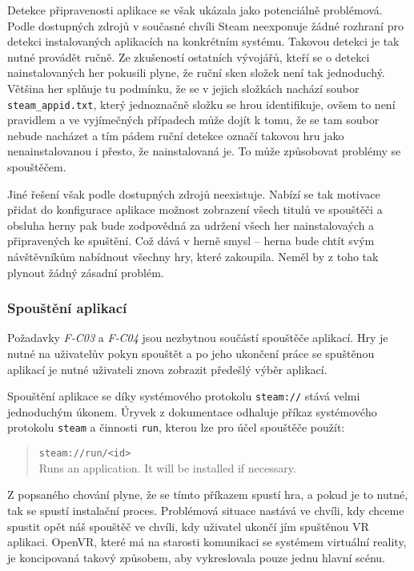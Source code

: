 Detekce připravenosti aplikace se však ukázala jako potenciálně
problémová. Podle dostupných zdrojů v současné chvíli Steam neexponuje
žádné rozhraní pro detekci instalovaných aplikacích na konkrétním
systému. Takovou detekci je tak nutné provádět ručně. Ze zkušeností
ostatních vývojářů, kteří se o detekci nainstalovaných her pokusili
plyne, že ruční sken složek není tak jednoduchý. Většina her splňuje tu
podmínku, že se v jejich složkách nachází soubor
\texttt{steam\_appid.txt}, který jednoznačně složku se hrou
identifikuje, ovšem to není pravidlem a ve vyjímečných případech může
dojít k tomu, že se tam soubor nebude nacházet a tím pádem ruční detekce
označí takovou hru jako nenainstalovanou i přesto, že nainstalovaná je.
To může způsobovat problémy se spouštěčem.

Jiné řešení však podle dostupných zdrojů neexistuje. Nabízí se tak
motivace přidat do konfigurace aplikace možnost zobrazení všech titulů
ve spouštěči a obsluha herny pak bude zodpovědná za udržení všech her
nainstalovaých a připravených ke spuštění. Což dává v herně smysl --
herna bude chtít svým návštěvníkům nabídnout všechny hry, které
zakoupila. Neměl by z toho tak plynout žádný zásadní problém.

\subsubsection{Spouštění
aplikací}\label{spouux161tux11bnuxed-aplikacuxed}

Požadavky \emph{F-C03} a \emph{F-C04} jsou nezbytnou součástí spouštěče
aplikací. Hry je nutné na uživatelův pokyn spouštět a po jeho ukončení
práce se spuštěnou aplikací je nutné uživateli znova zobrazit předešlý
výběr aplikací.

Spouštění aplikace se díky systémového protokolu \texttt{steam://} stává
velmi jednoduchým úkonem. Úryvek z dokumentace odhaluje příkaz
systémového protokolu \texttt{steam} a činnosti \texttt{run}, kterou lze
pro účel spouštěče použít:

\begin{quote}
\texttt{steam://run/\textless{}id\textgreater{}}\\
Runs an application. It will be installed if necessary.
\end{quote}

Z popsaného chování plyne, že se tímto příkazem spustí hra, a pokud je
to nutné, tak se spustí instalační proces. Problémová situace nastává ve
chvíli, kdy chceme spustit opět náš spouštěč ve chvíli, kdy uživatel
ukončí jím spuštěnou VR aplikaci. OpenVR, které má na starosti
komunikaci se systémem virtuální reality, je koncipovaná takový
způsobem, aby vykreslovala pouze jednu hlavní scénu.

